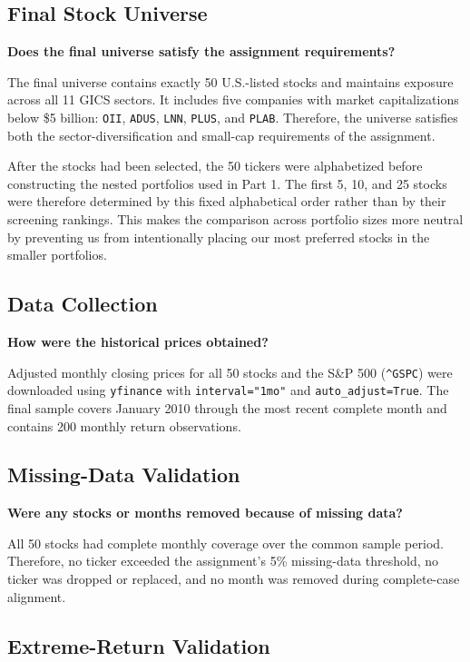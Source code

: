 \documentclass[11pt]{article}
\begin{document}
\subsection{Final Stock Universe}

\textbf{Does the final universe satisfy the assignment requirements?}

The final universe contains exactly 50 U.S.-listed stocks and maintains
exposure across all 11 GICS sectors. It includes five companies with market
capitalizations below \$5 billion: \texttt{OII}, \texttt{ADUS}, \texttt{LNN},
\texttt{PLUS}, and \texttt{PLAB}. Therefore, the universe satisfies both the
sector-diversification and small-cap requirements of the assignment.

After the stocks had been selected, the 50 tickers were alphabetized before
constructing the nested portfolios used in Part 1. The first 5, 10, and 25
stocks were therefore determined by this fixed alphabetical order rather than
by their screening rankings. This makes the comparison across portfolio sizes
more neutral by preventing us from intentionally placing our most preferred
stocks in the smaller portfolios.

\subsection{Data Collection}

\textbf{How were the historical prices obtained?}

Adjusted monthly closing prices for all 50 stocks and the S\&P 500
(\texttt{\^{}GSPC}) were downloaded using \texttt{yfinance} with
\texttt{interval="1mo"} and \texttt{auto\_adjust=True}. The final sample covers
January 2010 through the most recent complete month and contains 200 monthly
return observations.

\subsection{Missing-Data Validation}

\textbf{Were any stocks or months removed because of missing data?}

All 50 stocks had complete monthly coverage over the common sample period.
Therefore, no ticker exceeded the assignment's 5\% missing-data threshold, no
ticker was dropped or replaced, and no month was removed during complete-case
alignment.

\subsection{Extreme-Return Validation}
\end{document}

